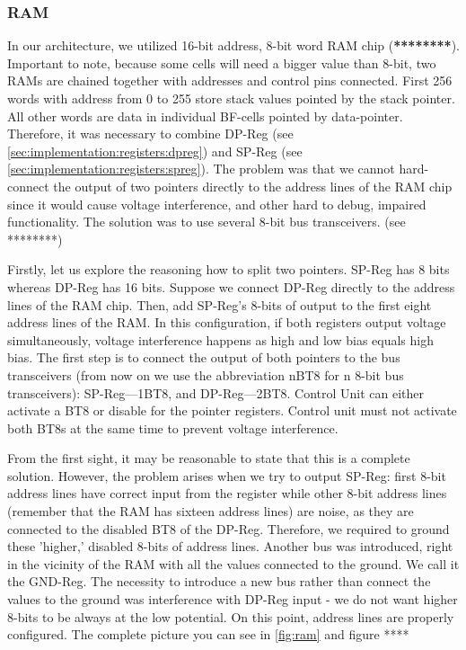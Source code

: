 \subsubsection{RAM} \label{sec:implementation:memory:ram}
In our architecture, we utilized 16-bit address, 8-bit word RAM chip (\textbf{********}). Important to note, because some cells will need a bigger value than 8-bit, two RAMs are chained together with addresses and control pins connected. First 256 words with address from 0 to 255 store stack values pointed by the stack pointer. All other words are data in individual BF-cells pointed by data-pointer. Therefore, it was necessary to combine DP-Reg (see \ref{sec:implementation:registers:dpreg}) and SP-Reg (see \ref{sec:implementation:registers:spreg}). The problem was that we cannot hard-connect the output of two pointers directly to the address lines of the RAM chip since it would cause voltage interference, and other hard to debug, impaired functionality. The solution was to use several 8-bit bus transceivers. (see ********)

Firstly, let us explore the reasoning how to split two pointers. SP-Reg has 8 bits whereas DP-Reg has 16 bits. Suppose we connect DP-Reg directly to the address lines of the RAM chip. Then, add SP-Reg's 8-bits of output to the first eight address lines of the RAM. In this configuration, if both registers output voltage simultaneously, voltage interference happens as high and low bias equals high bias. The first step is to connect the output of both pointers to the bus transceivers (from now on we use the abbreviation nBT8 for n 8-bit bus transceivers): SP-Reg---1BT8, and DP-Reg---2BT8. Control Unit can either activate a BT8 or disable for the pointer registers. Control unit must not activate both BT8s at the same time to prevent voltage interference.

From the first sight, it may be reasonable to state that this is a complete solution. However, the problem arises when we try to output SP-Reg: first 8-bit address lines have correct input from the register while other 8-bit address lines (remember that the RAM has sixteen address lines) are noise, as they are connected to the disabled BT8 of the DP-Reg. Therefore, we required to ground these 'higher,' disabled 8-bits of address lines. Another bus was introduced, right in the vicinity of the RAM with all the values connected to the ground. We call it the GND-Reg. The necessity to introduce a new bus rather than connect the values to the ground was interference with DP-Reg input - we do not want higher 8-bits to be always at the low potential. On this point, address lines are properly configured. The complete picture you can see in \ref{fig:ram} and figure ****

